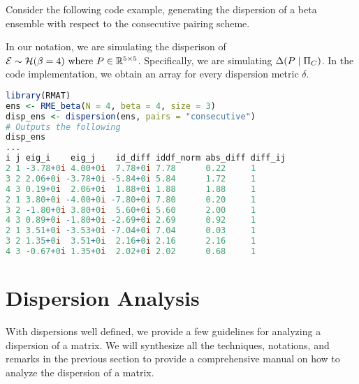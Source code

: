 Consider the following code example, generating the dispersion of a beta ensemble with respect to the consecutive pairing scheme.

\begin{code}
In our notation, we are simulating the disperison of $\mathcal{E} \sim \mathcal{H}(\beta = 4) \text{ where } P \in \mathbb{R}^{5 \times 5}$. Specifically, we are simulating $\Delta(P \mid \Pi_C)$. In the code implementation, we obtain an array for every dispersion metric $\delta$.
\end{code}
\begin{lstlisting}[language=R]
library(RMAT)
ens <- RME_beta(N = 4, beta = 4, size = 3)
disp_ens <- dispersion(ens, pairs = "consecutive")
# Outputs the following
disp_ens
...
i j eig_i    eig_j    id_diff iddf_norm abs_diff diff_ij
2 1 -3.78+0i 4.00+0i  7.78+0i 7.78      0.22     1
3 2 2.06+0i -3.78+0i -5.84+0i 5.84      1.72     1
4 3 0.19+0i  2.06+0i  1.88+0i 1.88      1.88     1
2 1 3.80+0i -4.00+0i -7.80+0i 7.80      0.20     1
3 2 -1.80+0i 3.80+0i  5.60+0i 5.60      2.00     1
4 3 0.89+0i -1.80+0i -2.69+0i 2.69      0.92     1
2 1 3.51+0i -3.53+0i -7.04+0i 7.04      0.03     1
3 2 1.35+0i  3.51+0i  2.16+0i 2.16      2.16     1
4 3 -0.67+0i 1.35+0i  2.02+0i 2.02      0.68     1
\end{lstlisting}


\section{Dispersion Analysis}

With dispersions well defined, we provide a few guidelines for analyzing a dispersion of a matrix. We will synthesize all the techniques, notations, and remarks in the previous section to provide a comprehensive manual on how to analyze the dispersion of a matrix.

%
%

